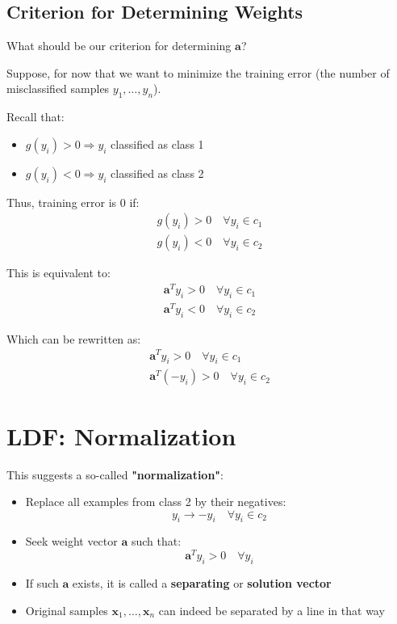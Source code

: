 \documentclass[11pt,a4paper]{article}
\theoremstyle{definition}
\theoremstyle{plain}
\theoremstyle{remark}
\begin{document}
\subsection{Criterion for Determining Weights}

What should be our criterion for determining $\mathbf{a}$?

Suppose, for now that we want to minimize the training error (the number of misclassified samples $y_1, \ldots, y_n$).

\begin{tcolorbox}[colback=green!5!white,colframe=green!75!black,title=\textbf{Zero Training Error Conditions}]
Recall that:
\begin{itemize}
    \item $g(y_i) > 0 \Rightarrow y_i$ classified as class 1
    \item $g(y_i) < 0 \Rightarrow y_i$ classified as class 2
\end{itemize}

Thus, training error is $0$ if:
\begin{align*}
g(y_i) > 0 \quad \forall y_i \in c_1 \\
g(y_i) < 0 \quad \forall y_i \in c_2
\end{align*}

This is equivalent to:
\begin{align*}
\mathbf{a}^T y_i > 0 \quad \forall y_i \in c_1 \\
\mathbf{a}^T y_i < 0 \quad \forall y_i \in c_2
\end{align*}

Which can be rewritten as:
\begin{align*}
\mathbf{a}^T y_i > 0 \quad \forall y_i \in c_1 \\
\mathbf{a}^T (-y_i) > 0 \quad \forall y_i \in c_2
\end{align*}
\end{tcolorbox}
\newpage
\section{LDF: Normalization}

This suggests a so-called \textbf{"normalization"}:

\begin{tcolorbox}[colback=blue!5!white,colframe=blue!75!black,title=\textbf{Normalization Procedure}]
\begin{itemize}
    \item Replace all examples from class 2 by their negatives:
    \[
    y_i \rightarrow -y_i \quad \forall y_i \in c_2
    \]
    
    \item Seek weight vector $\mathbf{a}$ such that:
    \[
    \mathbf{a}^T y_i > 0 \quad \forall y_i
    \]
    
    \item If such $\mathbf{a}$ exists, it is called a \textbf{separating} or \textbf{solution vector}
    
    \item Original samples $\mathbf{x}_1, \ldots, \mathbf{x}_n$ can indeed be separated by a line in that way
\end{itemize}
\end{tcolorbox}
\end{document}
